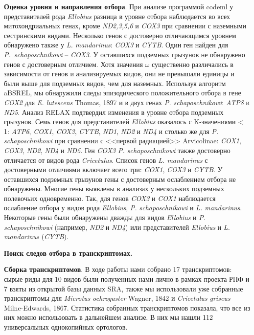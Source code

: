 \textbf{Оценка уровня и направления отбора}. При анализе программой codeml у представителей рода \textit{Ellobius} разница в уровне отбора наблюдается во всех митохондриальных генах, кроме \textit{ND2,3,5,6} и \textit{COX3} при сравнении с наземными сестринскими видами. Несколько генов с достоверно отличающимся уровнем обнаружено также у \textit{L. mandarinus}: \textit{COX3} и \textit{CYTB}. Один ген найден для \textit{P.\ schaposchnikowi} -- \textit{COX3}. У оставшихся подземных грызунов не обнаружено генов с достоверным отличием. Хотя значения $\omega$ существенно различались в зависимости от генов и анализируемых видов, они не превышали единицы и были выше для подземных видов, чем для наземных. Используя алгоритм aBSREL, мы обнаружили следы эпизодического положительного отбора в гене \textit{COX2} для \textit{E. lutescens} Thomas, 1897 и в двух генах \textit{P. schaposchnikowi}: \textit{ATP8} и \textit{ND5}. Анализ RELAX подтвердил изменения в уровне отбора подземных грызунов. Семь генов для представителей \textit{Ellobius} оказалось с K-значениями < 1: \textit{ATP6}, \textit{COX1}, \textit{COX3}, \textit{CYTB}, \textit{ND1}, \textit{ND2} и \textit{ND4} и столько же для \textit{P. schaposchnikowi} при сравнении с <<первой радиацией>> Arvicolinae: \textit{COX1}, \textit{COX3}, \textit{ND2}, \textit{ND4} и \textit{ND5}. Ген \textit{COX3} \textit{P. schaposchnikowi} также достоверно отличается от видов рода \textit{Cricetulus}. Список генов \textit{L. mandarinus} с достоверными отличиями включает всего три: \textit{COX1}, \textit{COX3} и \textit{CYTB}. У оставшихся подземных грызунов гены с достоверным ослаблением отбора не обнаружены. Многие гены выявлены в анализах у нескольких подземных полевочьих одновременно. Так, для генов \textit{COX3} и \textit{COX1} наблюдается ослабление отбора у видов рода \textit{Ellobius}, \textit{P. schaposchnikowi} и \textit{L. mandarinus}. Некоторые гены были обнаружены дважды для видов \textit{Ellobius} и \textit{P. schaposchnikowi} (например, \textit{ND2} и \textit{ND4}) или представителей \textit{Ellobius} и \textit{L. mandarinus} (\textit{CYTB}).

\vspace{3mm}

\hspace{-10mm}\textbf{\Large Поиск следов отбора в транскриптомах.}

\vspace{3mm}

\textbf{Сборка транскриптомов}. В ходе работы нами собрано 17 транскриптомов: сырые риды для 10 видов были полученных нами лично в рамках проекта РНФ и 7 взяты из открытой базы данных SRA, также мы использовали уже собранные транскриптомы для \textit{Microtus ochrogaster} Wagner, 1842 и \textit{Cricetulus griseus} Milne-Edwards, 1867. Статистика собранных транскриптомов показала, что все из них можно использовать в дальнейшем анализе. В них мы нашли 112 универсальных однокопийных ортологов. 

